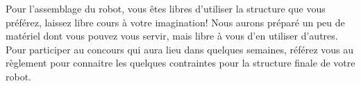 Pour l'assemblage du robot, vous êtes libres d'utiliser la structure que vous préférez, laissez libre cours à votre imagination! Nous aurons préparé un peu de matériel dont vous pouvez vous servir, mais libre à vous d'en utiliser d'autres. Pour participer au concours qui aura lieu dans quelques semaines, référez vous au règlement pour connaitre les quelques contraintes pour la structure finale de votre robot.